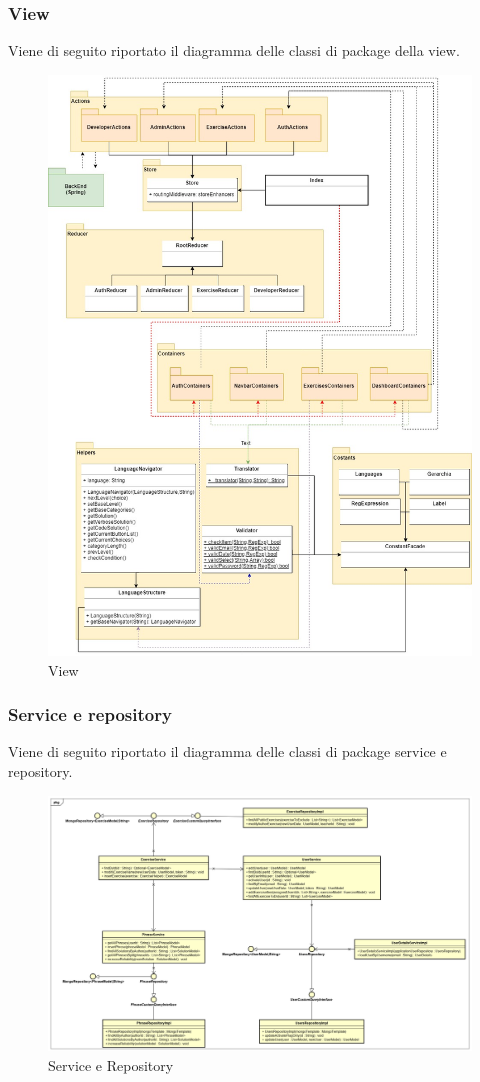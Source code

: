 \subsubsection{View}
Viene di seguito riportato il diagramma delle classi di package della view.
\begin{figure}[H]
\centering
\includegraphics[width=17cm, keepaspectratio]{img/view.jpg} 
\caption{View}
\end{figure}
\newpage
\subsubsection{Service e repository}
Viene di seguito riportato il diagramma delle classi di package service e repository.
\begin{figure}[H]
\centering
\includegraphics[width=17cm, keepaspectratio]{img/Service-repository.png} 
\caption{Service e Repository}
\end{figure}

